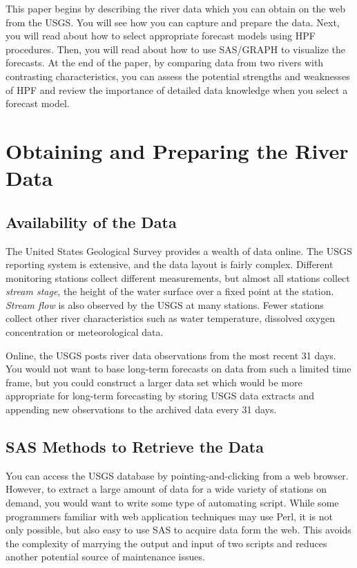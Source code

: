 \documentclass[10pt]{sugconf-ish}
\begin{document}
This paper begins by describing the river data which you can obtain on the web from the USGS. You will see how you can capture and prepare the data. Next, you will read about how to select appropriate forecast models using HPF procedures. Then, you will read about how to use SAS/GRAPH to visualize the forecasts. At the end of the paper, by comparing data from two rivers with contrasting characteristics, you can assess the potential strengths and weaknesses of HPF and review the importance of detailed data knowledge when you select a forecast model.




\section{Obtaining and Preparing the River Data}


\subsection{Availability of the Data}
The United States Geological Survey provides a wealth of data online. The USGS reporting system is extensive, and the data layout is fairly complex. Different monitoring stations collect different measurements, but almost all stations collect \emph{stream stage}, the height of the water surface over a fixed point at the station. \emph{Stream flow} is also observed by the USGS at many stations. Fewer stations collect other river characteristics such as water temperature, dissolved oxygen concentration or meteorological data.

Online, the USGS posts river data observations from the most recent 31 days. You would not want to base long-term forecasts on data from such a limited time frame, but you could construct a larger data set which would be more appropriate for long-term forecasting by storing USGS data extracts and appending new observations to the archived data every 31 days.


\subsection{SAS Methods to Retrieve the Data}
You can access the USGS database by pointing-and-clicking from a web browser. However, to extract a large amount of data for a wide variety of stations on demand, you would want to write some type of automating script. While some programmers familiar with web application techniques may use Perl, it is not only possible, but also easy to use SAS to acquire data form the web. This avoids the complexity of marrying the output and input of two scripts and reduces another potential source of maintenance issues.
\end{document}
